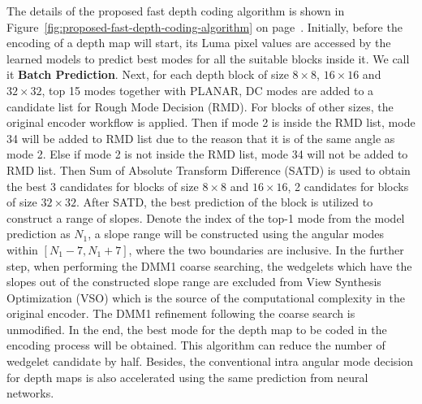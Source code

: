 The details of the proposed fast depth coding algorithm is shown 
in Figure~\ref{fig:proposed-fast-depth-coding-algorithm}
on page~\pageref{fig:proposed-fast-depth-coding-algorithm}.
Initially, before the encoding of a depth map will start, 
its Luma pixel values are accessed by the learned models to
predict best modes for all the suitable blocks inside it.
We call it \textbf{Batch Prediction}.
Next, for each depth block of 
size \(8\times8\), \(16\times16\) and \(32\times32\), 
top 15 modes together with PLANAR, DC modes are added to 
a candidate list for Rough Mode Decision (RMD).
For blocks of other sizes, the original encoder workflow
is applied.
Then if mode 2 is inside the RMD list, mode 34
will be added to RMD list due to the reason that
it is of the same angle as mode 2.
Else if mode 2 is not inside the RMD list, 
mode 34 will not be added to RMD list.
Then Sum of Absolute Transform Difference (SATD)
is used to obtain the best 3 candidates for blocks
of size \(8\times8\) and \(16\times16\), 2 candidates
for blocks of size \(32\times32\).
After SATD, the best prediction of the block
is utilized to construct a range of slopes.
Denote the index of the top-1 mode from the model 
prediction as \(N_1\), a slope range will be constructed 
using the angular modes within \([N_1-7, N_1+7]\), where
the two boundaries are inclusive.
In the further step, when performing the DMM1 coarse
searching, the wedgelets which have the slopes out of the 
constructed slope range are excluded from 
View Synthesis Optimization (VSO) which is the
source of the computational complexity in the original
encoder.
The DMM1 refinement following the coarse search is unmodified.
In the end, the best mode for the
depth map to be coded in the encoding process will
be obtained.
This algorithm can reduce the number of wedgelet candidate by 
half.
Besides, the conventional intra 
angular mode decision for depth maps is also
accelerated using the same prediction from 
neural networks.

